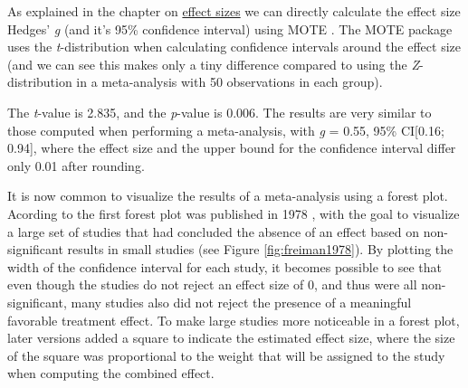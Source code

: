 \documentclass[
  oneside]{krantz}
\begin{document}
As explained in the chapter on \protect\hyperlink{effectsize}{effect sizes} we can directly calculate the effect size Hedges' \emph{g} (and it's 95\% confidence interval) using MOTE \citep{buchanan_mote_2017}. The MOTE package uses the \emph{t}-distribution when calculating confidence intervals around the effect size (and we can see this makes only a tiny difference compared to using the \emph{Z}-distribution in a meta-analysis with 50 observations in each group).

The \emph{t}-value is 2.835, and the \emph{p}-value is 0.006. The results are very similar to those computed when performing a meta-analysis, with \emph{g} = 0.55, 95\% CI{[}0.16; 0.94{]}, where the effect size and the upper bound for the confidence interval differ only 0.01 after rounding.

It is now common to visualize the results of a meta-analysis using a forest plot. Acording to \citet{cooper_handbook_2009} the first forest plot was published in 1978 \citep{freiman_importance_1978}, with the goal to visualize a large set of studies that had concluded the absence of an effect based on non-significant results in small studies (see Figure \ref{fig:freiman1978}). By plotting the width of the confidence interval for each study, it becomes possible to see that even though the studies do not reject an effect size of 0, and thus were all non-significant, many studies also did not reject the presence of a meaningful favorable treatment effect. To make large studies more noticeable in a forest plot, later versions added a square to indicate the estimated effect size, where the size of the square was proportional to the weight that will be assigned to the study when computing the combined effect.
\end{document}
